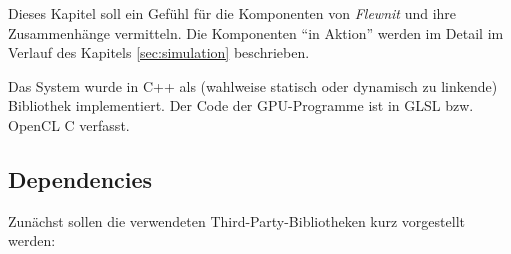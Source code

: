 
\label{sec:systemArchitecture}

Dieses Kapitel soll ein Gefühl für die Komponenten von \emph{Flewnit} und 
ihre Zusammenhänge vermitteln. Die Komponenten "`in Aktion"' werden im Detail im Verlauf des Kapitels 
\ref{sec:simulation} beschrieben.

Das System wurde in C++ als (wahlweise statisch oder dynamisch zu linkende) Bibliothek implementiert.
Der Code der GPU-Programme ist in GLSL bzw. OpenCL C verfasst.

\subsection{Dependencies}
	\label{sec:dependencies}
	
	Zunächst sollen die verwendeten Third-Party-Bibliotheken kurz vorgestellt werden:

